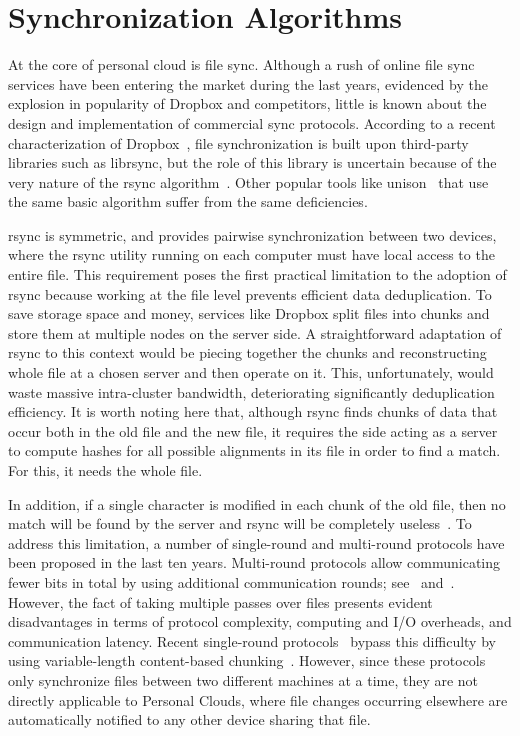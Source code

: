 \section{Synchronization Algorithms}

At the core of personal cloud is file sync. Although a rush of online file sync services have
been entering the market during the last years, evidenced by the explosion in popularity of
Dropbox and competitors, little is known about the design and implementation of commercial
sync protocols. According to a recent characterization of Dropbox~\cite{drago2012inside}, file synchronization
is built upon third-party libraries such as librsync, but the role of this library is uncertain
because of the very nature of the rsync algorithm~\cite{tridgell96rsync}. Other popular tools like 
unison~\cite{unison} that use the same basic algorithm suffer from the same deficiencies.

rsync is symmetric, and provides pairwise synchronization between two devices, where the rsync
utility running on each computer must have local access to the entire file. This requirement
poses the first practical limitation to the adoption of rsync because working at the file level
prevents efficient data deduplication. To save storage space and money, services like Dropbox
split files into chunks and store them at multiple nodes on the server side. A straightforward
adaptation of rsync to this context would be piecing together the chunks and reconstructing
whole file at a chosen server and then operate on it. This, unfortunately, would waste massive
intra-cluster bandwidth, deteriorating significantly deduplication efficiency. It is worth
noting here that, although rsync finds chunks of data that occur both in the old file and the
new file, it requires the side acting as a server to compute hashes for all possible alignments
in its file in order to find a match. For this, it needs the whole file.  

In addition, if a single character is modified in each chunk of the old file, then no match
will be found by the server and rsync will be completely useless~\cite{langford01}. To address this limitation,
a number of single-round and multi-round protocols have been proposed in the last ten years. 
Multi-round protocols allow communicating fewer bits in total by using additional communication
rounds; see~\cite{langford01} and~\cite{suel04}. However, the fact of taking multiple passes over files presents evident
disadvantages in terms of protocol complexity, computing and I/O overheads, and communication
latency. Recent single-round protocols~\cite{irmak05}\cite{hao08} bypass this difficulty by using variable-length
content-based chunking~\cite{Muthitacharoen01}. However, since these protocols only synchronize files between two
different machines at a time, they are not directly applicable to Personal Clouds, where file
changes occurring elsewhere are automatically notified to any other device sharing that file. 

